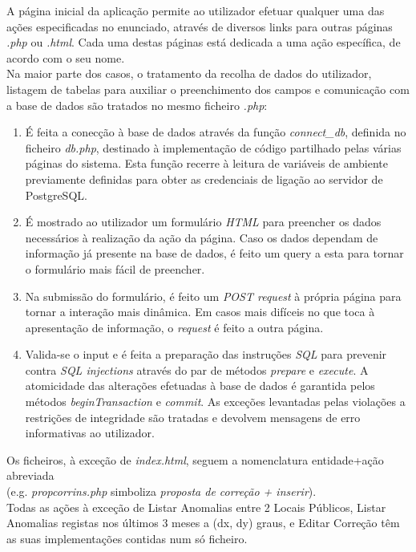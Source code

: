 \documentclass[12pt]{report}
\begin{document}
    \normalsize
    \vspace{2mm}

    \hspace*{1em}
    A página inicial da aplicação permite ao utilizador efetuar qualquer uma das ações especificadas no enunciado, através de diversos links para outras páginas \textit{.php} ou \textit{.html}. Cada uma destas páginas está dedicada a uma ação específica, de acordo com o seu nome. \\

    \hspace*{1em} Na maior parte dos casos, o tratamento da recolha de dados do utilizador, listagem de tabelas para auxiliar o preenchimento dos campos e comunicação com a base de dados são tratados no mesmo ficheiro \textit{.php}:
    \\
    \begin{enumerate}
        \item É feita a conecção à base de dados através da função \textit{connect\_db}, definida no ficheiro \textit{db.php}, destinado à implementação de código partilhado pelas várias páginas do sistema. Esta função recerre à leitura de variáveis de ambiente previamente definidas para obter as credenciais de ligação ao servidor de PostgreSQL.
        \item É mostrado ao utilizador um formulário \textit{HTML} para preencher os dados necessários à realização da ação da página. Caso os dados dependam de informação já presente na base de dados, é feito um query a esta para tornar o formulário mais fácil de preencher.
        \item Na submissão do formulário, é feito um \textit{POST request} à própria página para tornar a interação mais dinâmica. Em casos mais difíceis no que toca à apresentação de informação, o \textit{request} é feito a outra página.
        \item Valida-se o input e é feita a preparação das instruções \textit{SQL} para prevenir contra \textit{SQL injections} através do par de métodos \textit{prepare} e \textit{execute}. A atomicidade das alterações efetuadas à base de dados é garantida pelos métodos \textit{beginTransaction} e \textit{commit}. As exceções levantadas pelas violações a restrições de integridade são tratadas e devolvem mensagens de erro informativas ao utilizador.
    \end{enumerate}
    \hspace*{1em}
    Os ficheiros, à exceção de \textit{index.html}, seguem a nomenclatura entidade+ação abreviada \\ (e.g. \textit{propcorrins.php} simboliza \textit{proposta de correção + inserir}). \\
    \hspace*{1em}
    Todas as ações à exceção de Listar Anomalias entre 2 Locais Públicos, Listar Anomalias registas nos últimos 3 meses a (dx, dy) graus, e Editar Correção têm as suas implementações contidas num só ficheiro.
\end{document}
